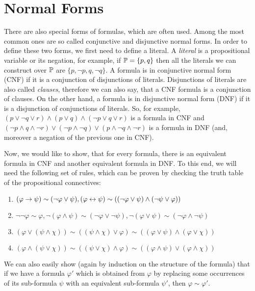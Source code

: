 \section{Normal Forms}

There are also special forms of formulas, which are often used. Among the most common ones are so called conjunctive and disjunctive normal forms. In order to define these two forms, we first need to define a literal. A \emph{literal} is a propositional variable or its negation, for example, if $\mathbb{P} = \{p, q\}$ then all the literals we can construct over $\mathbb{P}$ are $\{p, \neg p, q, \neg q\}$. A formula is in conjunctive normal form (CNF) if it is a conjunction of disjunctions of literals. Disjunctions of literals are also called \emph{clauses}, therefore we can also say, that a CNF formula is a conjunction of clauses. On the other hand, a formula is in disjunctive normal form (DNF) if it is a disjunction of conjunctions of literals. So, for example, $(p \lor \neg q \lor r) \land (p \lor q) \land (\neg p \lor q \lor r)$ is a formula in CNF and$(\neg p \land q \land \neg r) \lor (\neg p \land \neg q) \lor (p \land \neg q \land \neg r)$ is a formula in DNF (and, moreover a negation of the previous one in CNF). 

Now, we would like to show, that for every formula, there is an equivalent formula in CNF and another equivalent formula in DNF. To this end, we will need the following set of rules, which can be proven by checking the truth table of the propositional connectives: 

\begin{enumerate}
  \item $(\varphi \to \psi) \sim (\neg \varphi \lor \psi), (\varphi \leftrightarrow \psi) \sim ((\neg \varphi \lor \psi) \land (\neg \psi \lor \varphi))$
  \item $\neg \neg \varphi \sim \varphi, \neg (\varphi \land \psi) \sim (\neg \varphi \lor \neg \psi), \neg (\varphi \lor \psi) \sim (\neg \varphi \land \neg \psi)$
  \item $(\varphi \lor (\psi \land \chi)) \sim ((\psi \land \chi)  \lor \varphi) \sim ((\varphi \lor \psi) \land (\varphi \lor \chi))$
  \item $(\varphi \land (\psi \lor \chi)) \sim ((\psi \lor \chi)  \land \varphi) \sim ((\varphi \land \psi) \lor (\varphi \land \chi))$
\end{enumerate}

We can also easily show (again by induction on the structure of the formula) that if we have a formula $\varphi'$ which is obtained from $\varphi$ by replacing some occurrences of its sub-formula $\psi$ with an equivalent sub-formula $\psi'$, then $\varphi \sim \varphi'$.

